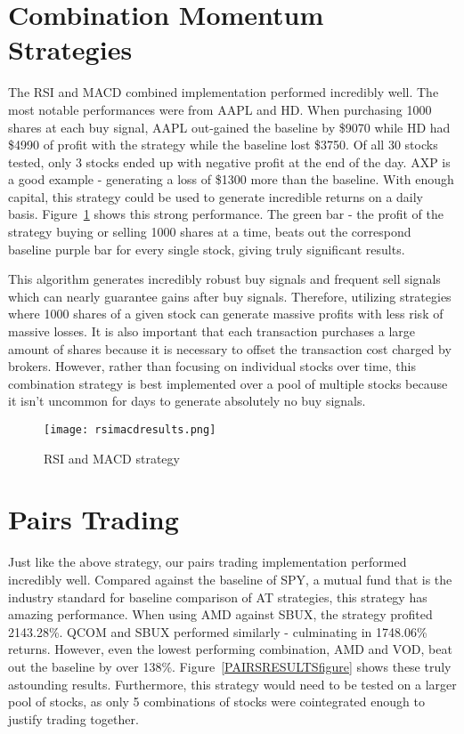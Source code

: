 \documentclass[../thesis.tex]{subfiles}
\begin{document}
\section{Combination Momentum Strategies}

The RSI and MACD combined implementation performed incredibly well. The most notable performances were from AAPL and HD. When purchasing 1000 shares at each buy signal, AAPL out-gained the baseline by \$9070  while HD had \$4990 of profit with the strategy while the baseline lost \$3750. Of all 30 stocks tested, only 3 stocks ended up with negative profit at the end of the day. AXP is a good example - generating a loss of \$1300 more than the baseline. With enough capital, this strategy could be used to generate incredible returns on a daily basis. Figure~\ref{RSIMACDRESULTSfigure} shows this strong performance. The green bar - the profit of the strategy buying or selling 1000 shares at a time, beats out the correspond baseline purple bar for every single stock, giving truly significant results. 

This algorithm generates incredibly robust buy signals and frequent sell signals which can nearly guarantee gains after buy signals. Therefore, utilizing strategies where 1000 shares of a given stock can generate massive profits with less risk of massive losses. It is also important that each transaction purchases a large amount of shares because it is necessary to offset the transaction cost charged by brokers. However, rather than focusing on individual stocks over time, this combination strategy is best implemented over a pool of multiple stocks because it isn't uncommon for days to generate absolutely no buy signals.

\begin{figure}[h]
\centering
\texttt{[image: rsimacdresults.png]}
\caption{RSI and MACD strategy   \label{overflow}}
\label{RSIMACDRESULTSfigure}
\end{figure} 

\section{Pairs Trading}

Just like the above strategy, our pairs trading implementation performed incredibly well. Compared against the baseline of SPY, a mutual fund that is the industry standard for baseline comparison of AT strategies, this strategy has amazing performance. When using AMD against SBUX, the strategy profited 2143.28\%. QCOM and SBUX performed similarly - culminating in 1748.06\% returns. However, even the lowest performing combination, AMD and VOD, beat out the baseline by over 138\%. Figure~\ref{PAIRSRESULTSfigure} shows these truly astounding results. Furthermore, this strategy would need to be tested on a larger pool of stocks, as only 5 combinations of stocks were cointegrated enough to justify trading together. 
\end{document}
